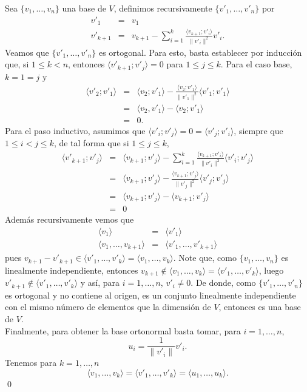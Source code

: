 \dem Sea $\{v_1,\ldots,v_n\}$ una base de $V$, definimos recursivamente $\{v'_1,\ldots,v'_n\}$ por
\begin{eqnarray*}
v'_1 & = & v_1\\
v'_{k+1} & = & v_{k+1}-\sum_{i=1}^k\frac{\langle v_{k+1};v'_i\rangle}{\|v'_i\|^2} v'_i.
\end{eqnarray*}
Veamos que $\{v'_1,\ldots,v'_n\}$ es ortogonal. Para esto, basta establecer por inducci\'on que, si $1\le k< n$, entonces $\langle v'_{k+1};v'_j\rangle=0$ para $1\le j\le k$. Para el caso base, $k=1=j$ y
\begin{eqnarray*}
\langle v'_2;v'_1\rangle & = & \langle v_2;v'_1\rangle-\frac{\langle v_2;v'_1\rangle}{\|v'_1\|^2} \langle v'_1;v'_1\rangle\\
  & = & \langle v_2,v'_1\rangle-\langle v_2;v'_1\rangle\\
  & = & 0.
\end{eqnarray*}
Para el paso inductivo, asumimos que $\langle v'_i;v'_j\rangle=0=\langle v'_j;v'_i\rangle$, siempre que $1\le i<j\le k$, de tal forma que si $1\le j\le k$,
\begin{eqnarray*}
\langle v'_{k+1};v'_j\rangle & = & \langle v_{k+1}; v'_j\rangle-\sum_{i=1}^k\frac{\langle v_{k+1};v'_i\rangle}{\|v'_i\|^2}\langle v'_i; v'_j\rangle\\
 & = & \langle v_{k+1}; v'_j\rangle-\frac{\langle v_{k+1};v'_j\rangle}{\|v'_j\|^2}\langle v'_j; v'_j\rangle\\
 & = & \langle v_{k+1}; v'_j\rangle-\langle v_{k+1}; v'_j\rangle\\
 & = & 0
\end{eqnarray*}
Adem\'as recursivamente vemos que
\begin{eqnarray*}
\langle v_1\rangle & = & \langle v'_1\rangle \\
\langle v_1,\ldots,v_{k+1}\rangle & = & \langle v'_1,\ldots,v'_{k+1}\rangle
\end{eqnarray*}
pues $v_{k+1}-v'_{k+1}\in\langle v'_1,\ldots,v'_k\rangle=\langle v_1,\ldots,v_k\rangle$. Note que, como $\{v_1,\ldots,v_n\}$ es linealmente independiente, entonces $v_{k+1}\not\in\langle v_1,\ldots,v_k\rangle=\langle v'_1,\ldots,v'_k\rangle$, luego $v'_{k+1}\not\in\langle v'_1,\ldots,v'_k\rangle$ y as\'i, para $i=1,\ldots,n$, $v'_i\ne 0$. De donde, como $\{v'_1,\ldots,v'_n\}$ es ortogonal y no contiene al origen, es un conjunto linealmente independiente con el mismo n\'umero de elementos que la dimensi\'on de $V$, entonces es una base de $V$.\\
Finalmente, para obtener la base ortonormal basta tomar, para $i=1,\ldots,n$,
\[
u_i=\frac{1}{\|v'_i\|}v'_i.
\]
Tenemos para $k=1,\ldots,n$
\[
\langle v_1,\ldots,v_k\rangle=\langle v'_1,\ldots,v'_k\rangle=\langle u_1,\ldots,u_k\rangle.
\]
\qed


